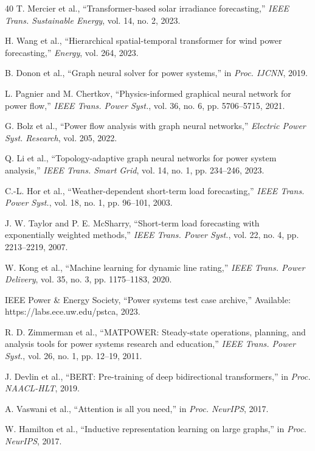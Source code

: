 \documentclass[journal,12pt,onecolumn]{IEEEtran}
\begin{document}
\begin{thebibliography}{40}
T. Mercier et al., ``Transformer-based solar irradiance forecasting,'' \emph{IEEE Trans. Sustainable Energy}, vol. 14, no. 2, 2023.

H. Wang et al., ``Hierarchical spatial-temporal transformer for wind power forecasting,'' \emph{Energy}, vol. 264, 2023.

B. Donon et al., ``Graph neural solver for power systems,'' in \emph{Proc. IJCNN}, 2019.

L. Pagnier and M. Chertkov, ``Physics-informed graphical neural network for power flow,'' \emph{IEEE Trans. Power Syst.}, vol. 36, no. 6, pp. 5706--5715, 2021.

G. Bolz et al., ``Power flow analysis with graph neural networks,'' \emph{Electric Power Syst. Research}, vol. 205, 2022.

Q. Li et al., ``Topology-adaptive graph neural networks for power system analysis,'' \emph{IEEE Trans. Smart Grid}, vol. 14, no. 1, pp. 234--246, 2023.

C.-L. Hor et al., ``Weather-dependent short-term load forecasting,'' \emph{IEEE Trans. Power Syst.}, vol. 18, no. 1, pp. 96--101, 2003.

J. W. Taylor and P. E. McSharry, ``Short-term load forecasting with exponentially weighted methods,'' \emph{IEEE Trans. Power Syst.}, vol. 22, no. 4, pp. 2213--2219, 2007.

W. Kong et al., ``Machine learning for dynamic line rating,'' \emph{IEEE Trans. Power Delivery}, vol. 35, no. 3, pp. 1175--1183, 2020.

IEEE Power \& Energy Society, ``Power systems test case archive,'' Available: https://labs.ece.uw.edu/pstca, 2023.

R. D. Zimmerman et al., ``MATPOWER: Steady-state operations, planning, and analysis tools for power systems research and education,'' \emph{IEEE Trans. Power Syst.}, vol. 26, no. 1, pp. 12--19, 2011.

J. Devlin et al., ``BERT: Pre-training of deep bidirectional transformers,'' in \emph{Proc. NAACL-HLT}, 2019.

A. Vaswani et al., ``Attention is all you need,'' in \emph{Proc. NeurIPS}, 2017.

W. Hamilton et al., ``Inductive representation learning on large graphs,'' in \emph{Proc. NeurIPS}, 2017.


\end{thebibliography}
\end{document}
